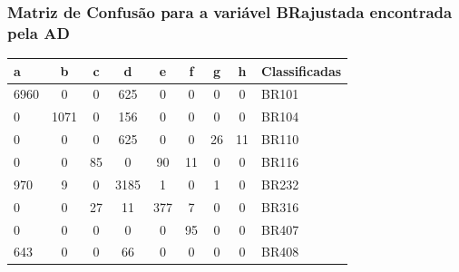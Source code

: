 \documentclass[11pt]{beamer}
\begin{document}
\begin{frame}\frametitle{Matriz de Confusão para a variável BRajustada encontrada pela AD}
	\begin{table}[!ht]
		\centering
		\vspace{1mm}
		\begin{tabular}{l|c|c|c|c|c|c|c|l}
			\hline
			\textbf{a} & \textbf{b} & \textbf{c} & \textbf{d} & \textbf{e} & \textbf{f} & \textbf{g} & \textbf{h} & \textbf{Classificadas}\\
			\hline
			6960 & 0 & 0 & 625 & 0 & 0 & 0 & 0 & BR101 \\
			0 & 1071 & 0 & 156 & 0 & 0 & 0 & 0  & BR104 \\
			0 & 0 & 0 & 625 & 0 & 0 & 26 & 11  & BR110 \\
			0 & 0 & 85 & 0 & 90 & 11 & 0 & 0  & BR116 \\
			970 & 9 & 0 & 3185 & 1 & 0 & 1 & 0  & BR232 \\
			0 & 0 & 27 & 11 & 377 & 7 & 0 & 0  & BR316 \\
			0 & 0 & 0 & 0 & 0 & 95 & 0 & 0  & BR407 \\
			643 & 0 & 0 & 66 & 0 & 0 & 0 & 0  & BR408 \\
		\end{tabular}
	\end{table}
\end{frame}
\end{document}
